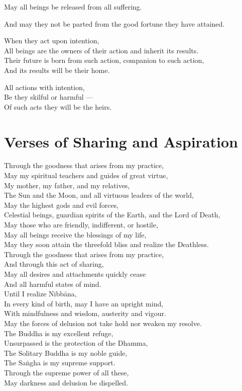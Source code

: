 May all beings be released from all suffering.

And may they not be parted from the good fortune they have attained.

When they act upon intention,\\
All beings are the owners of their action and inherit its results.\\
Their future is born from such action, companion to such action,\\
And its results will be their home.

All actions with intention,\\
Be they skilful or harmful ---\\
Of such acts they will be the heirs.


\section{Verses of Sharing and Aspiration}

\begin{leader}
\end{leader}

Through the goodness that arises from my practice,\\
May my spiritual teachers and guides of great virtue,\\
My mother, my father, and my relatives,\\
The Sun and the Moon, and all virtuous leaders of the world,\\
May the highest gods and evil forces,\\
Celestial beings, guardian spirits of the Earth, and the Lord of Death,\\
May those who are friendly, indifferent, or hostile,\\
May all beings receive the blessings of my life,\\
May they soon attain the threefold bliss and realize the Deathless.\\
Through the goodness that arises from my practice,\\
And through this act of sharing,\\
May all desires and attachments quickly cease\\
And all harmful states of mind.\\
Until I realize Nibbāna,\\
In every kind of birth, may I have an upright mind,\\
With mindfulness and wisdom, austerity and vigour.\\
May the forces of delusion not take hold nor weaken my resolve.\\
The Buddha is my excellent refuge,\\
Unsurpassed is the protection of the Dhamma,\\
The Solitary Buddha is my noble guide,\\
The Saṅgha is my supreme support.\\
Through the supreme power of all these,\\
May darkness and delusion be dispelled.

